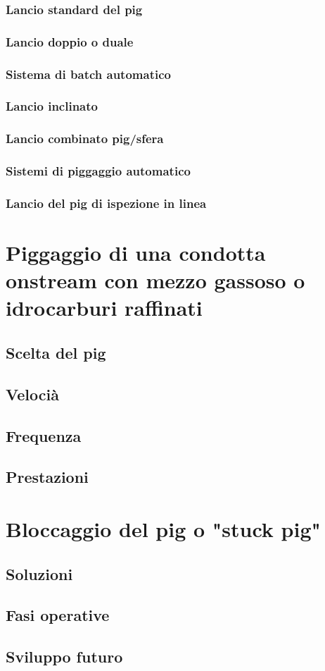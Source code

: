 \subsubsection{Lancio standard del pig}
\subsubsection{Lancio doppio o duale}
\subsubsection{Sistema di batch automatico}
\subsubsection{Lancio inclinato}
\subsubsection{Lancio combinato pig/sfera}
\subsubsection{Sistemi di piggaggio automatico}
\subsubsection{Lancio del pig di ispezione in linea}

\section{Piggaggio di una condotta onstream con mezzo gassoso o idrocarburi raffinati}
\subsection{Scelta del pig}
\subsection{Velocià}
\subsection{Frequenza}
\subsection{Prestazioni}

\section{Bloccaggio del pig o "stuck pig"}
\subsection{Soluzioni}
\subsection{Fasi operative}
\subsection{Sviluppo futuro}